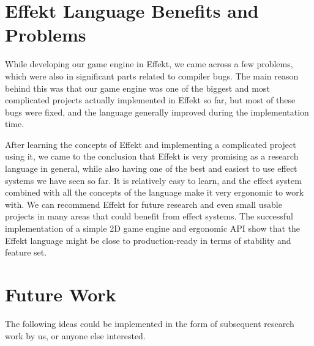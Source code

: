 \section*{Effekt Language Benefits and Problems}

While developing our game engine in Effekt, we came across a few problems, which were also in significant parts related to compiler bugs. The main reason behind this was that our game engine was one of the biggest and most complicated projects actually implemented in Effekt so far, but most of these bugs were fixed, and the language generally improved during the implementation time.

After learning the concepts of Effekt and implementing a complicated project using it, we came to the conclusion that Effekt is very promising as a research language in general, while also having one of the best and easiest to use effect systems we have seen so far. It is relatively easy to learn, and the effect system combined with all the concepts of the language make it very ergonomic to work with. We can recommend Effekt for future research and even small usable projects in many areas that could benefit from effect systems. The successful implementation of a simple 2D game engine and ergonomic API show that the Effekt language might be close to production-ready in terms of stability and feature set.

\section*{Future Work}

The following ideas could be implemented in the form of subsequent research work by us, or anyone else interested.

